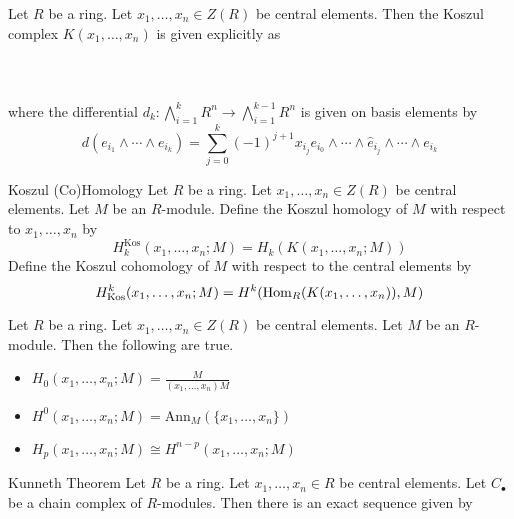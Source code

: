 \documentclass[a4paper]{article}
\begin{document}
\begin{thm}{}{} Let $R$ be a ring. Let $x_1,\dots,x_n\in Z(R)$ be central elements. Then the Koszul complex $K(x_1,\dots,x_n)$ is given explicitly as \\~\\
\\~\\
where the differential $d_k:\bigwedge_{i=1}^kR^n\to\bigwedge_{i=1}^{k-1}R^n$ is given on basis elements by $$d(e_{i_1}\wedge\cdots\wedge e_{i_k})=\sum_{j=0}^k(-1)^{j+1}x_{i_j}e_{i_0}\wedge\cdots\wedge\hat{e}_{i_j}\wedge\cdots\wedge e_{i_k}$$
\end{thm}

\begin{defn}{Koszul (Co)Homology}{} Let $R$ be a ring. Let $x_1,\dots,x_n\in Z(R)$ be central elements. Let $M$ be an $R$-module. Define the Koszul homology of $M$ with respect to $x_1,\dots,x_n$ by $$H_k^\text{Kos}(x_1,\dots,x_n;M)=H_k(K(x_1,\dots,x_n;M))$$ Define the Koszul cohomology of $M$ with respect to the central elements by $$H_\text{Kos}^k(x_1,\dots,x_n;M)=H^k(\operatorname{Hom}_R(K(x_1,\dots,x_n)),M)$$
\end{defn}

\begin{lmm}{}{} Let $R$ be a ring. Let $x_1,\dots,x_n\in Z(R)$ be central elements. Let $M$ be an $R$-module. Then the following are true. 
\begin{itemize}
\item $H_0(x_1,\dots,x_n;M)=\frac{M}{(x_1,\dots,x_n)M}$
\item $H^0(x_1,\dots,x_n;M)=\text{Ann}_M(\{x_1,\dots,x_n\})$
\item $H_p(x_1,\dots,x_n;M)\cong H^{n-p}(x_1,\dots,x_n;M)$
\end{itemize}
\end{lmm}

\begin{thm}{Kunneth Theorem}{} Let $R$ be a ring. Let $x_1,\dots,x_n\in R$ be central elements. Let $C_\bullet$ be a chain complex of $R$-modules. Then there is an exact sequence given by \\~\\
\end{thm}
\end{document}

